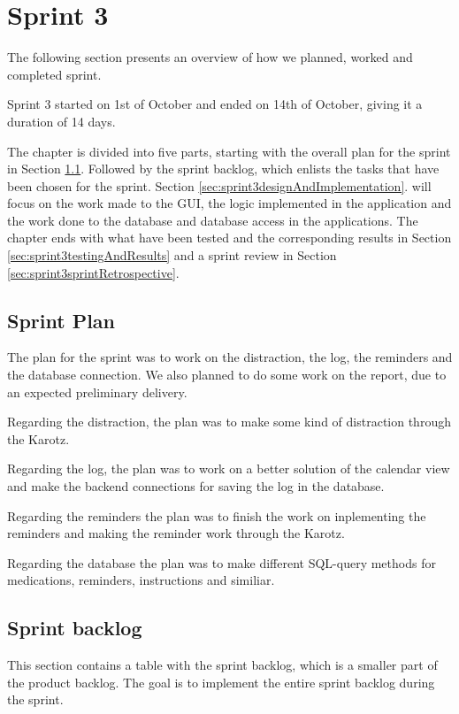 \chapter{Sprint 3}
\label{chap:sprint3}
The following section presents an overview of how we planned, worked and
completed sprint.

Sprint 3 started on 1st of October and ended on 14th of October, giving it a duration of 14 days. 

The chapter is divided into five parts, starting with the overall plan for the
sprint in Section \ref{sec:sprint3sprintplan}. Followed by the sprint backlog, which
enlists the tasks that have been chosen for the sprint. Section
\ref{sec:sprint3designAndImplementation}.
will focus on the work made to the GUI, the logic implemented in the application and the work done to the database and database access in the applications.
The chapter ends with what have been tested and the corresponding results in
Section \ref{sec:sprint3testingAndResults} and a sprint review in Section
\ref{sec:sprint3sprintRetrospective}.

\section{Sprint Plan}
\label{sec:sprint3sprintplan}
The plan for the sprint was to work on the distraction, the log, the reminders and the database connection. 
We also planned to do some work on the report, due to an expected preliminary delivery.

Regarding the distraction, the plan was to make some kind of distraction through the Karotz.

Regarding the log, the plan was to work on a better solution of the calendar view and make the backend 
connections for saving the log in the database.

Regarding the reminders the plan was to finish the work on inplementing the reminders and making the reminder 
work through the Karotz.

Regarding the database the plan was to make different SQL-query methods for medications, reminders, 
instructions and similiar.

\section{Sprint backlog}
This section contains a table with the sprint backlog, which is a smaller part of the product backlog. The 
goal is to implement the entire sprint backlog during the sprint.

